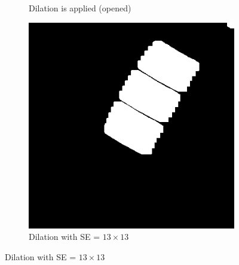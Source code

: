 \documentclass[a4paper]{article}
\begin{document}
\begin{figure}[htp]
\begin{subfigure}{.33\textwidth}
  \caption{Dilation is applied (opened)}
  \label{fig:sub2}
\end{subfigure}
\begin{subfigure}{.33\textwidth}
  \centering
  \includegraphics[width=.9\linewidth]{ex4.4-dilated}
  \caption{Dilation with SE = $13\times 13$}
  \label{fig:sub2}
\end{subfigure}
\captionsetup{format=empty}
\label{fig:test}
\end{figure}
\end{document}
